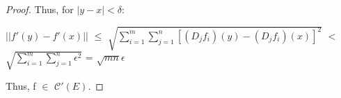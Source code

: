 \begin{proof}
        Thus, for $|y-x| < \delta$:

        \hspace{0.3cm}
        $||f'(y) - f'(x)||$
        $\leq$ $\sqrt{\sum_{i=1}^m \sum_{j=1}^n [(D_jf_i)(y) - (D_jf_i)(x)]^2}$
        $<$ $\sqrt{\sum_{i=1}^m \sum_{j=1}^n \epsilon^2}$
        = $\sqrt{mn}\epsilon$

        Thus, f $\in$ $\mathscr{C}'(E)$.
    \end{proof}




